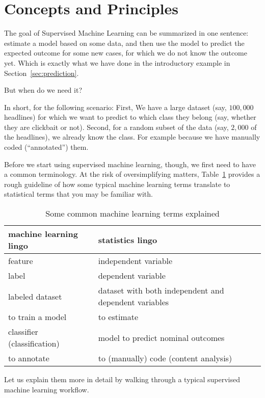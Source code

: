 \section{Concepts and Principles}

The goal of Supervised Machine Learning can be summarized in one sentence:
estimate a model based on some data, and then use the model to predict the
expected outcome for some new cases, for which we do not know the outcome yet.
Which is exactly what we have done in the introductory example in Section~\ref{sec:prediction}.

But when do we need it?

In short, for the following scenario: First, We have a large dataset (say, $100,000$
headlines) for which we want to predict to which class they belong (say, whether
they are clickbait or not). Second, for a random subset of the data (say, $2,000$ of
the headlines), we already know the class. For example because we have manually
coded (``annotated'') them.

Before we start using supervised machine learning, though, we first need to have
a common terminology.
At the risk of oversimplifying matters, Table~\ref{tab:mllingo} provides a rough
guideline of how some typical machine learning terms translate to statistical
terms that you may be familiar with.

\begin{table}
  \centering
\begin{tabularx}{\textwidth}{XX}
\toprule
machine learning lingo  & statistics lingo\\ \midrule
feature                 & independent variable  \\
label                   & dependent variable  \\
labeled dataset         & dataset with both independent and dependent variables\\
to train a model        & to estimate \\
classifier (classification)  & model to predict nominal outcomes \\
to annotate             & to (manually) code (content analysis) \\
\bottomrule
\end{tabularx}
\caption{Some common machine learning terms explained\label{tab:mllingo}}
\end{table}

Let us explain them more in detail by walking through a typical supervised
machine learning workflow.

